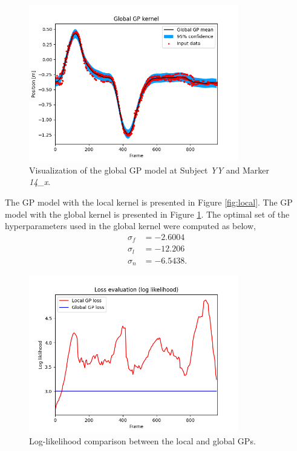\documentclass[conference]{IEEEtran}
\begin{document}
\begin{figure}[!t]
	\centering
	\includegraphics[width=3.6in]{global.png}	
	\caption{Visualization of the global GP model at Subject \textit{YY} and Marker \textit{14\_x}.}
	\label{fig:global}
\end{figure}

The GP model with the local kernel is presented in Figure \ref{fig:local}.
The GP model with the global kernel is presented in Figure \ref{fig:global}.
The optimal set of the hyperparameters used in the global kernel were computed as below,
\begin{equation}
\begin{aligned}
\sigma_f &= -2.6004\\
\sigma_l &= -12.206\\
\sigma_n &= -6.5438.
\end{aligned}
\end{equation}

\begin{figure}[!t]
	\centering
	\includegraphics[width=3.6in]{log_likelihood.png}	
	\caption{Log-likelihood comparison between the local and global GPs.}
	\label{fig:likelihood}
\end{figure}
\end{document}

